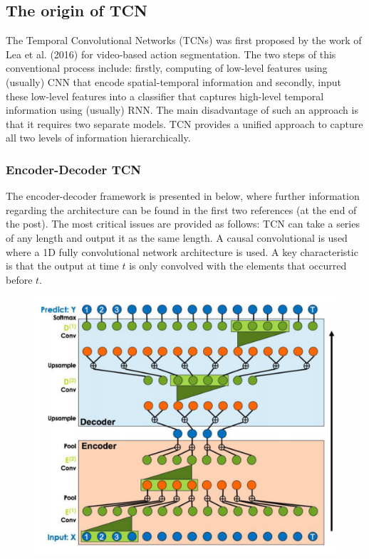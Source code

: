 \subsection{The origin of TCN}
The Temporal Convolutional Networks (TCNs) was first proposed by the work of Lea et al. (2016) for video-based action segmentation. The two steps of this conventional process include: firstly, computing of low-level features using (usually) CNN that encode spatial-temporal information and secondly, input these low-level features into a classifier that captures high-level temporal information using (usually) RNN. The main disadvantage of such an approach is that it requires two separate models. TCN provides a unified approach to capture all two levels of information hierarchically.

\subsubsection{Encoder-Decoder TCN} The encoder-decoder framework is presented in below, where further information regarding the architecture can be found in the first two references (at the end of the post). The most critical issues are provided as follows: TCN can take a series of any length and output it as the same length. A causal convolutional is used where a 1D fully convolutional network architecture is used. A key characteristic is that the output at time $t$ is only convolved with the elements that occurred before $t$. 
\begin{figure}[h]
    \includegraphics[width=\textwidth]{../Figures/ch3_1.png}
\end{figure}
